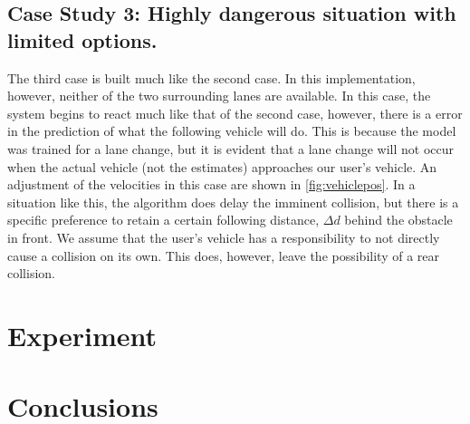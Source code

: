 \documentclass[conference]{IEEEtran}
\begin{document}
\subsection{Case Study 3: Highly dangerous situation with limited options.}
The third case is built much like the second case. In this implementation, however, neither of the two surrounding lanes are available. In this case, the system begins to react much like that of the second case, however, there is a error in the prediction of what the following vehicle will do. This is because the model was trained for a lane change, but it is evident that a lane change will not occur when the actual vehicle (not the estimates) approaches our user's vehicle. An adjustment of the velocities in this case are shown in \ref{fig:vehiclepos}. In a situation like this, the algorithm does delay the imminent collision, but there is a specific preference to retain a certain following distance, $\Delta d$ behind the obstacle in front. We assume that the user's vehicle has a responsibility to not directly cause a collision on its own. This does, however, leave the possibility of a rear collision.




\section{Experiment}
\section{Conclusions}

\newpage

%
%
%


  
  





\end{document}
